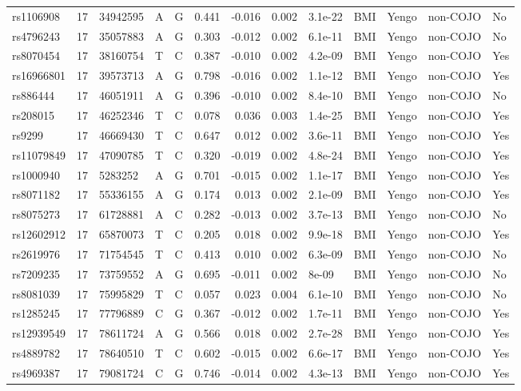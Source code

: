 \documentclass[11pt,twoside]{bristolthesis}
\begin{document}
\begin{longtable}[t]{lrlllrrrlllll}
rs1106908 & 17 & 34942595 & A & G & 0.441 & -0.016 & 0.002 & 3.1e-22 & BMI & Yengo & non-COJO & No\\
rs4796243 & 17 & 35057883 & A & G & 0.303 & -0.012 & 0.002 & 6.1e-11 & BMI & Yengo & non-COJO & No\\
rs8070454 & 17 & 38160754 & T & C & 0.387 & -0.010 & 0.002 & 4.2e-09 & BMI & Yengo & non-COJO & Yes\\
rs16966801 & 17 & 39573713 & A & G & 0.798 & -0.016 & 0.002 & 1.1e-12 & BMI & Yengo & non-COJO & Yes\\
\addlinespace
rs886444 & 17 & 46051911 & A & G & 0.396 & -0.010 & 0.002 & 8.4e-10 & BMI & Yengo & non-COJO & No\\
rs208015 & 17 & 46252346 & T & C & 0.078 & 0.036 & 0.003 & 1.4e-25 & BMI & Yengo & non-COJO & Yes\\
rs9299 & 17 & 46669430 & T & C & 0.647 & 0.012 & 0.002 & 3.6e-11 & BMI & Yengo & non-COJO & Yes\\
rs11079849 & 17 & 47090785 & T & C & 0.320 & -0.019 & 0.002 & 4.8e-24 & BMI & Yengo & non-COJO & Yes\\
rs1000940 & 17 & 5283252 & A & G & 0.701 & -0.015 & 0.002 & 1.1e-17 & BMI & Yengo & non-COJO & Yes\\
\addlinespace
rs8071182 & 17 & 55336155 & A & G & 0.174 & 0.013 & 0.002 & 2.1e-09 & BMI & Yengo & non-COJO & Yes\\
rs8075273 & 17 & 61728881 & A & C & 0.282 & -0.013 & 0.002 & 3.7e-13 & BMI & Yengo & non-COJO & No\\
rs12602912 & 17 & 65870073 & T & C & 0.205 & 0.018 & 0.002 & 9.9e-18 & BMI & Yengo & non-COJO & Yes\\
rs2619976 & 17 & 71754545 & T & C & 0.413 & 0.010 & 0.002 & 6.3e-09 & BMI & Yengo & non-COJO & No\\
rs7209235 & 17 & 73759552 & A & G & 0.695 & -0.011 & 0.002 & 8e-09 & BMI & Yengo & non-COJO & No\\
\addlinespace
rs8081039 & 17 & 75995829 & T & C & 0.057 & 0.023 & 0.004 & 6.1e-10 & BMI & Yengo & non-COJO & No\\
rs1285245 & 17 & 77796889 & C & G & 0.367 & -0.012 & 0.002 & 1.7e-11 & BMI & Yengo & non-COJO & Yes\\
rs12939549 & 17 & 78611724 & A & G & 0.566 & 0.018 & 0.002 & 2.7e-28 & BMI & Yengo & non-COJO & Yes\\
rs4889782 & 17 & 78640510 & T & C & 0.602 & -0.015 & 0.002 & 6.6e-17 & BMI & Yengo & non-COJO & Yes\\
rs4969387 & 17 & 79081724 & C & G & 0.746 & -0.014 & 0.002 & 4.3e-13 & BMI & Yengo & non-COJO & Yes\\

\end{longtable}
\end{document}
